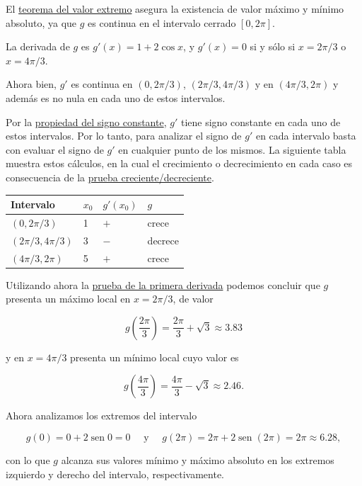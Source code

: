 \documentclass[
  letterpaper,
]{book}
\theoremstyle{plain}
\theoremstyle{remark}
\begin{document}
\begin{tcolorbox}[enhanced jigsaw, opacityback=0, left=2mm, opacitybacktitle=0.6, toprule=.15mm, bottomrule=.15mm, colbacktitle=quarto-callout-tip-color!10!white, titlerule=0mm, bottomtitle=1mm, title=\textcolor{quarto-callout-tip-color}{\faLightbulb}\hspace{0.5em}{Solución}, toptitle=1mm, colframe=quarto-callout-tip-color-frame, colback=white, breakable, rightrule=.15mm, arc=.35mm, leftrule=.75mm, coltitle=black]

El \hyperref[teo-valor-ext]{teorema del valor extremo} asegura la
existencia de valor máximo y mínimo absoluto, ya que \(g\) es continua
en el intervalo cerrado \([0, 2\pi]\).

La derivada de \(g\) es \(g'(x)=1+2\cos x\), y \(g'(x)=0\) si y sólo si
\(x=2\pi/3\) o \(x=4\pi/3\).

Ahora bien, \(g'\) es continua en \((0,2\pi/3)\), \((2\pi/3,4\pi/3)\) y
en \((4\pi/3,2\pi)\) y además es no nula en cada uno de estos
intervalos.

Por la \hyperref[teo-propiedad-signoconst]{propiedad del signo
constante}, \(g'\) tiene signo constante en cada uno de estos
intervalos. Por lo tanto, para analizar el signo de \(g'\) en cada
intervalo basta con evaluar el signo de \(g'\) en cualquier punto de los
mismos. La siguiente tabla muestra estos cálculos, en la cual el
crecimiento o decrecimiento en cada caso es consecuencia de la
\hyperref[teo-prueba-cd]{prueba creciente/decreciente}.

\begin{longtable}[]{@{}llll@{}}
\toprule\noalign{}
Intervalo & \(x_0\) & \(g'(x_0)\) & \(g\) \\
\midrule\noalign{}
\endhead
\bottomrule\noalign{}
\endlastfoot
\((0,2\pi/3)\) & 1 & \(+\) & crece \\
\((2\pi/3,4\pi/3)\) & 3 & \(-\) & decrece \\
\((4\pi/3,2\pi)\) & 5 & \(+\) & crece \\
\end{longtable}

Utilizando ahora la \hyperref[teo-prueba-primerader]{prueba de la
primera derivada} podemos concluir que \(g\) presenta un máximo local en
\(x=2\pi/3\), de valor

\[
g\left(\frac{2\pi}{3}\right)=\frac{2\pi}{3}+\sqrt{3}\approx 3.83
\]

y en \(x=4\pi/3\) presenta un mínimo local cuyo valor es

\[
g\left(\frac{4\pi}{3}\right)=\frac{4\pi}{3}-\sqrt{3}\approx 2.46.
\]

Ahora analizamos los extremos del intervalo

\[
g(0)=0+2\operatorname{sen} 0=0 \quad \text{ y } \quad g(2\pi)=2\pi+2\operatorname{sen}(2\pi)=2\pi \approx 6.28,
\]

con lo que \(g\) alcanza sus valores mínimo y máximo absoluto en los
extremos izquierdo y derecho del intervalo, respectivamente.

\end{tcolorbox}
\end{document}
